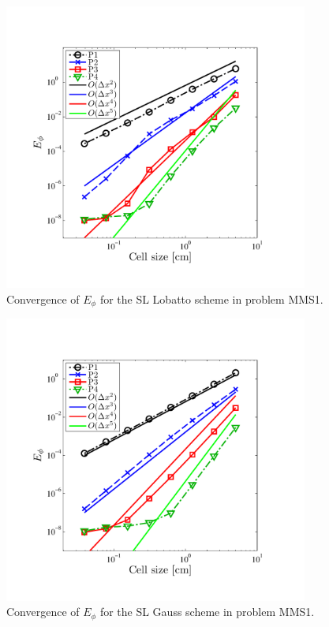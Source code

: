 \begin{figure}[!hbp]
\centering
\includegraphics[width=10cm,trim=0.25in  0.5in 0.75in 0.75in,clip=true]{chapter6_grey_radtran/Dissertation_Data/MMS2_SLXS_Lobatto_phi_L2.pdf}
\caption{Convergence of $E_{\phi}$ for the SL Lobatto scheme in problem MMS1.}
\label{fig:mms1_lobatto_phi}
\end{figure}
%
%
\begin{figure}[!htp]
\centering
\includegraphics[width=10cm,trim=0.25in  0.5in 0.75in 0.75in,clip=true]{chapter6_grey_radtran/Dissertation_Data/MMS2_SLXS_Gauss_phi_L2.pdf}
\caption{Convergence of $E_{\phi}$ for the SL Gauss scheme in problem MMS1.}
\label{fig:mms1_gauss_phi}
\end{figure}
%

